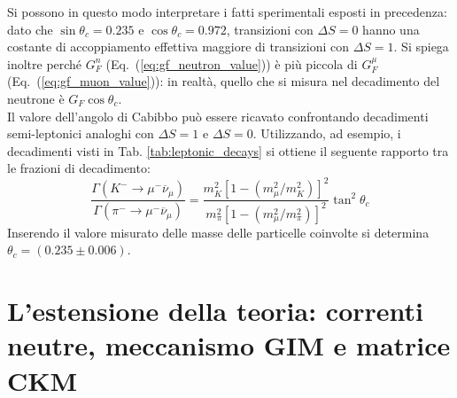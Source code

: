 \documentclass{subnucbo}
\begin{document}
Si possono in questo modo interpretare i fatti sperimentali esposti in precedenza: dato che $\sin\theta_{c}=0.235$ e $\cos\theta_{c}=0.972$, transizioni con $\Delta S = 0$ hanno una costante di accoppiamento effettiva maggiore di transizioni con $\Delta S = 1$. Si spiega inoltre perché $G_{F}^{n}$ (Eq.~(\ref{eq:gf_neutron_value})) è più piccola di $G_{F}^{\mu}$ (Eq.~(\ref{eq:gf_muon_value})): in realtà, quello che si misura nel decadimento del neutrone è $G_{F}\cos \theta_{c}$. \\
Il valore dell'angolo di Cabibbo può essere ricavato confrontando decadimenti semi-leptonici analoghi con $\Delta S = 1$ e $\Delta S = 0$. Utilizzando, ad esempio, i decadimenti visti in Tab. \ref{tab:leptonic_decays} si ottiene il seguente rapporto tra le frazioni di decadimento:
\begin{equation}
        \frac { \Gamma \left( K ^ { - } \rightarrow \mu ^ { - } \overline\nu _ { \mu } \right) } { \Gamma \left( \pi ^ { - } \rightarrow \mu ^ { - } \overline \nu _ { \mu } \right) } = \frac { m _ { K } ^ { 2 } \left[ 1 - \left( m _ { \mu } ^ { 2 } / m _ { K } ^ { 2 } \right) \right] ^ { 2 } } { m _ { \pi } ^ { 2 } \left[ 1 - \left( m _ { \mu } ^ { 2 } / m _ { \pi } ^ { 2 } \right) \right] ^ { 2 } } \tan ^ { 2 } \theta _ { c }
\end{equation}
Inserendo il valore misurato delle masse delle particelle coinvolte si determina $\theta_{c} = (0.235 \pm 0.006)$.

\section{L'estensione della teoria: correnti neutre, meccanismo GIM e matrice CKM}
\label{sec:part_two}
\end{document}
